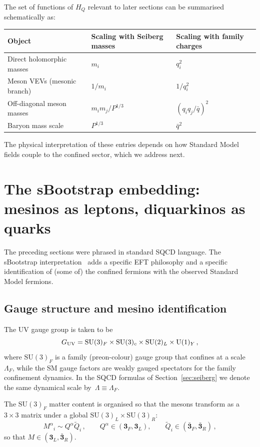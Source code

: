\documentclass[11pt,a4paper]{article}
\newcommand{\SU}{\mathrm{SU}}
\newcommand{\UU}{\mathrm{U}}
\begin{document}
The set of functions of $H_Q$ relevant to later sections can be summarised
schematically as:
\begin{center}
{\small
\begin{tabular}{@{}lll@{}}
  \toprule
  Object & Scaling with Seiberg masses & Scaling with family charges \\
  \midrule
  Direct holomorphic masses & $m_i$ & $q_i^2$ \\
  Meson VEVs (mesonic branch) & $1/m_i$ & $1/q_i^2$ \\
  Off-diagonal meson masses & $m_i m_j/P^{1/3}$ & $(q_i q_j/\bar q)^2$ \\
  Baryon mass scale & $P^{1/3}$ & $\bar q^2$ \\
  \bottomrule
\end{tabular}}
\end{center}
The physical interpretation of these entries depends on how Standard Model
fields couple to the confined sector, which we address next.

\section{The sBootstrap embedding: mesinos as leptons, diquarkinos as quarks}
\label{sec:sbootstrap}

The preceding sections were phrased in standard SQCD language.  The sBootstrap
interpretation~\cite{Rivero:2024epjc} adds a specific EFT philosophy and a
specific identification of (some of) the confined fermions with the observed
Standard Model fermions.

\subsection{Gauge structure and mesino identification}
\label{sec:sbootstrap_mesinos}

The UV gauge group is taken to be
\begin{equation}
  G_{\rm UV} = \SU(3)_F \times \SU(3)_c \times \SU(2)_L \times \UU(1)_Y\,,
  \label{eq:GUV}
\end{equation}
where $\SU(3)_F$ is a family (preon-colour) gauge group that confines at a
scale~$\Lambda_F$, while the SM gauge factors are weakly gauged spectators for
the family confinement dynamics.
In the SQCD formulas of Section~\ref{sec:seiberg} we denote the same dynamical
scale by~$\Lambda\equiv \Lambda_F$.

The $\SU(3)_F$ matter content is organised so that the mesons transform as a
$3\times 3$ matrix under a global $\SU(3)_L\times\SU(3)_R$:
\begin{equation}
  M^\alpha{}_i \sim Q^\alpha \tilde Q_i\,,\qquad
  Q^\alpha \in (\mathbf{3}_F,\mathbf{3}_L),\qquad
  \tilde Q_i \in (\bar{\mathbf{3}}_F,\bar{\mathbf{3}}_R)\,,
  \label{eq:preons}
\end{equation}
so that $M\in(\mathbf{3}_L,\bar{\mathbf{3}}_R)$.
\end{document}
